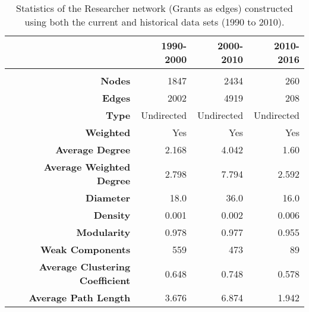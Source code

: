 {\begin{table}[htbp]
\centering
\caption[Statistics of the Researcher network (Grants as edges) constructed using both the historical (1990 to 2010) and current (2010 to 2016) data sets]{Statistics of the Researcher network (Grants as edges) constructed using both the current and historical data sets (1990 to 2010).}
\label{table:researcher_b_stats}
\begin{tabular}{r|rrr}
{} & \textbf{1990-2000} & \textbf{2000-2010} & \textbf{2010-2016}\\
\hline\\
\textbf{Nodes}                          & {1847}   & {2434}    & {260}\\
\textbf{Edges}                          & {2002}   & {4919}    & {208}\\
\textbf{Type}                           & {Undirected} & {Undirected} & {Undirected}\\
\textbf{Weighted}                       & {Yes}    & {Yes}     & {Yes}\\
\textbf{Average Degree}                 & {2.168}  & {4.042}   & {1.60}\\
\textbf{Average Weighted Degree}        & {2.798}  & {7.794}   & {2.592}\\
\textbf{Diameter}                       & {18.0}   & {36.0}    & {16.0}\\
\textbf{Density}                        & {0.001}  & {0.002}   & {0.006}\\
\textbf{Modularity}                     & {0.978}  & {0.977}   & {0.955}\\
\textbf{Weak Components}                & {559}    & {473}     & {89}\\
\textbf{Average Clustering Coefficient} & {0.648}  & {0.748}   & {0.578}\\
\textbf{Average Path Length}            & {3.676}  & {6.874}   & {1.942}\\
\end{tabular}
\end{table}

}
